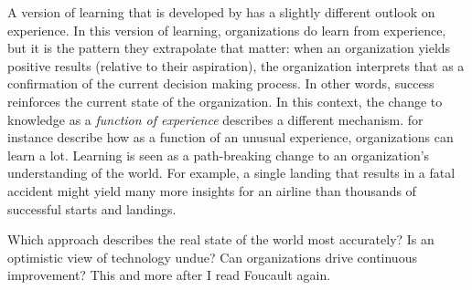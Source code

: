\documentclass[12pt, man, natbib]{apa6}
\begin{document}
	A version of learning that is developed by \citet{Levinthal1993} has a slightly different outlook on experience. In this version of learning, organizations do learn from experience, but it is the pattern they extrapolate that matter: when an organization yields positive results (relative to their aspiration), the organization interprets that as a confirmation of the current decision making process. In other words, success reinforces the current state of the organization. In this context, the change to knowledge as a \textit{function of experience} describes a different mechanism. \citet{March1991} for instance describe how as a function of an unusual experience, organizations can learn a lot. Learning is seen as a path-breaking change to an organization's understanding of the world. For example, a single landing that results in a fatal accident might yield many more insights for an airline than thousands of successful starts and landings.
	
	Which approach describes the real state of the world most accurately? Is an optimistic view of technology undue? Can organizations drive continuous improvement? This and more after I read Foucault again.


\end{document}
